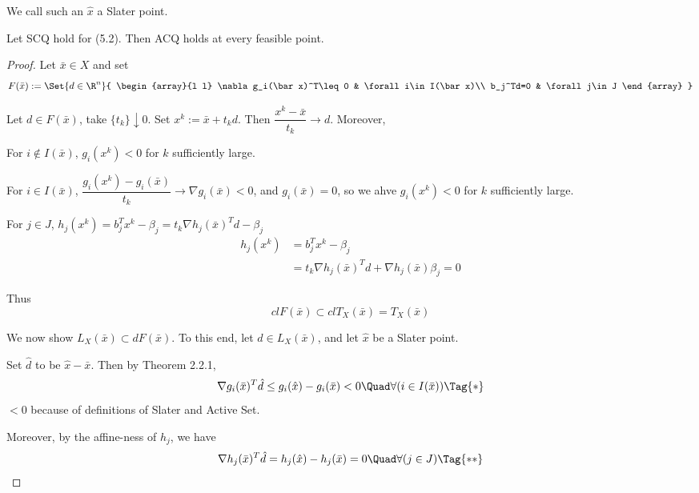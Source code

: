 We call such an $\hat x$ a Slater point.


Let SCQ hold for (5.2). Then ACQ holds at every feasible point.

\begin{proof}
	\def\bx{\bar x}\def\bl{\bar\lambda}\def\bm{\bar\mu}
	\def\LC{L_X(\bar x)}
	\def\TC{T_X(\bar x)}
	\def\Act{I(\bx)}

	Let $\bx\in X$ and set
	$$
		F(\bx):=\Set{d\in\R^n}{
			\begin{array}{l l}
				\nabla g_i(\bx)^T\leq0 & \forall i\in\Act \\
				b_j^Td=0               & \forall j\in J
			\end{array}
		}
	$$

	\Lemma{}{$F(\bx)\subset T_X(\bx)$} Let $d\in F(\bx)$, take
	$\{t_k\}\downarrow0$. Set $x^k:=\bar x+t_kd$. Then $\dfrac{x^k-\bar
			x}{t_k}\to d$. Moreover,

	For $i\notin\Act$, $g_i(x^k)<0$ for $k$ sufficiently large.

	For $i\in\Act$, $\dfrac{g_i(x^k)-g_i(\bx)}{t_k}\to\nabla
		g_i(\bx)<0$, and $g_i(\bx)=0$, so we ahve $g_i(x^k)<0$ for $k$
	sufficiently large.

	For $j\in J$, $h_j(x^k)=b_j^Tx^k-\beta_j=t_k\nabla h_j(\bx)^Td-\beta_j$
	\begin{align*}
		h_j(x^k) & =b_j^Tx^k-\beta_j                                 \\
		         & =t_k\nabla h_j(\bx)^Td+\nabla h_j(\bx)\beta_j = 0
	\end{align*}

	Thus
	$$
		cl F(\bx)\subset cl\TC=\TC
	$$

	We now show $\LC\subset dF(\bx)$. To this end, let $d\in\LC$, and
	let $\hat x$ be a Slater point.

	Set $\hat d$ to be $\hat x-\bar x$. Then by Theorem 2.2.1,
	\begin{equation*}
		\nabla g_i(\bx)^T\hat d\leq g_i(\hat x) - g_i(\bx)<0\Quad\forall(i\in\Act)\Tag{*}
	\end{equation*}
	$<0$ because of definitions of Slater and Active Set.

	Moreover, by the affine-ness of $h_j$, we have
	\begin{align*}
		\nabla h_j(\bx)^T\hat d = h_j(\hat x)-h_j(\bx)=0\Quad\forall(j\in J)\Tag{**}
	\end{align*}


\end{proof}
